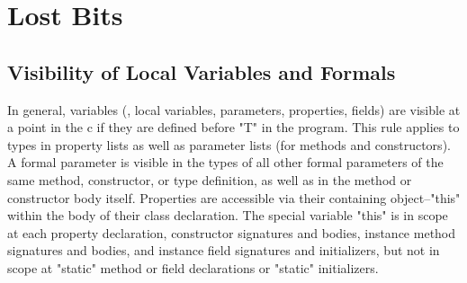 \chapter{Lost Bits}


\section{Visibility of Local Variables and Formals}

In general, variables (\ie, local variables, parameters,
properties, fields) are visible at
a point in the c
if they are defined before \xcd"T" in the program. This rule applies to
types in property lists as well as parameter lists (for methods and
constructors).
A formal parameter is visible in the types of all other formal
parameters of the same method, constructor, or type definition,
as well as in the method or constructor body itself.
Properties are accessible via their containing object--\xcd"this"
within the body of their class declaration.  The special
variable \xcd"this" is in scope at each property
declaration, constructor signatures and bodies, instance method signatures
and bodies,
and instance field signatures and initializers, but not in scope
at \xcd"static" method or field declarations or \xcd"static"
initializers.  

